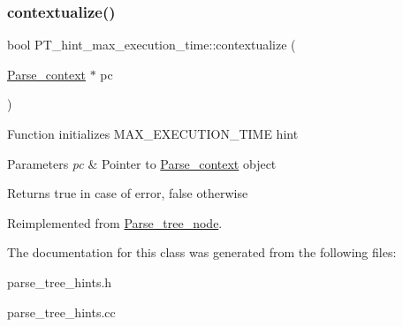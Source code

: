 \subsubsection{\texorpdfstring{contextualize()}{contextualize()}}
{\footnotesize\ttfamily bool P\+T\+\_\+hint\+\_\+max\+\_\+execution\+\_\+time\+::contextualize (\begin{DoxyParamCaption}\item[{\mbox{\hyperlink{structParse__context}{Parse\+\_\+context}} $\ast$}]{pc }\end{DoxyParamCaption})\hspace{0.3cm}{\ttfamily [virtual]}}

Function initializes M\+A\+X\+\_\+\+E\+X\+E\+C\+U\+T\+I\+O\+N\+\_\+\+T\+I\+ME hint


\begin{DoxyParams}{Parameters}
{\em pc} & Pointer to \mbox{\hyperlink{structParse__context}{Parse\+\_\+context}} object\\
\hline
\end{DoxyParams}
\begin{DoxyReturn}{Returns}
true in case of error, false otherwise 
\end{DoxyReturn}


Reimplemented from \mbox{\hyperlink{classParse__tree__node_a22d93524a537d0df652d7efa144f23da}{Parse\+\_\+tree\+\_\+node}}.



The documentation for this class was generated from the following files\+:\begin{DoxyCompactItemize}
\item 
parse\+\_\+tree\+\_\+hints.\+h\item 
parse\+\_\+tree\+\_\+hints.\+cc\end{DoxyCompactItemize}

